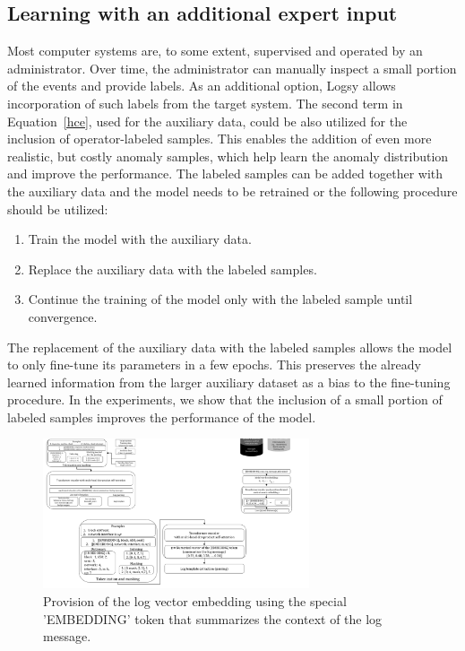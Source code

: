 \subsection{Learning with an additional expert input}
Most computer systems are, to some extent, supervised and operated by an administrator. Over time, the administrator can manually inspect a small portion of the events and provide labels.
As an additional option, Logsy allows incorporation of such labels from the target system. The second term in Equation~\ref{hce}, used for the auxiliary data, could be also utilized for the inclusion of operator-labeled samples. This enables the addition of even more realistic, but costly anomaly samples, which help learn the anomaly distribution and improve the performance. The labeled samples can be added together with the auxiliary data and the model needs to be retrained or the following procedure should be utilized:
\begin{enumerate}
    \item Train the model with the auxiliary data.
    \item Replace the auxiliary data with the labeled samples.
    \item Continue the training of the model only with the labeled sample until convergence.
\end{enumerate}

The replacement of the auxiliary data with the labeled samples allows the model to only fine-tune its parameters in a few epochs. This preserves the already learned information from the larger auxiliary dataset as a bias to the fine-tuning procedure. In the experiments, we show that the inclusion of a small portion of labeled samples improves the performance of the model.



\begin{figure}[!b]
\centering
\includegraphics[width=0.7\textwidth]{gfx/chap5/gettingembeddings.pdf}
\caption{Provision of the log vector embedding using the special 'EMBEDDING' token that summarizes the context of the log message.}
\label{fig:gettingembeddings}
\end{figure}


